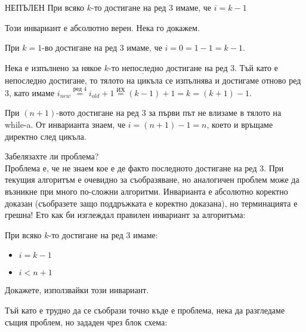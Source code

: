 \begin{boxinvariant*}{НЕПЪЛЕН}{}
	При всяко $k$-то достигане на ред 3 имаме, че $i=k-1$
\end{boxinvariant*}

\noindent
Този инвариант е абсолютно верен. Нека го докажем.

\begin{base}
	При $k=1$-во достигане на ред 3 имаме, че $i=0=1-1=k-1$.
\end{base}

\begin{maintenance}
	Нека е изпълнено за някое $k$-то $\underline{\text{непоследно}}$ достигане на ред 3. Тъй като е непоследно достигане, то тялото на цикъла се изпълнява и достигаме отново ред 3, като имаме $i_{new}\overset{\text{ред 4}}{=}i_{old}+1\overset{\text{ИХ}}{=}(k-1)+1=k=(k+1)-1$.
\end{maintenance}

\begin{termination}
	При $(n+1)$-вото достигане на ред 3 за първи път не влизаме в тялото на while-a. От инварианта знаем, че $i=(n+1)-1=n$, което и връщаме директно след цикъла.
\end{termination}

\leavevmode\newline\noindent
Забелязахте ли проблема?\\
\leavevmode\newline\noindent
Проблема е, че не знаем кое е де факто $\textbf{последното}$ достигане на ред 3. При текущия алгоритъм е очевидно за съобразяване, но аналогичен проблем може да възникне при много по-сложни алгоритми. Инварианта е абсолютно коректно доказан (съобразете защо поддръжката е коректно доказана), но терминацията е грешна! Ето как би изглеждал правилен инвариант за алгоритъма:

\begin{boxinvariant*}{}{}
	При всяко $k$-то достигане на ред 3 имаме:
	\begin{itemize}
		\item $i=k-1$
		\item $i<n+1$
	\end{itemize}
\end{boxinvariant*}

\noindent
Докажете, използвайки този инвариант.

\leavevmode\newline

\noindent
Тъй като е трудно да се съобрази точно къде е проблема, нека да разгледаме същия проблем, но зададен чрез блок схема:

